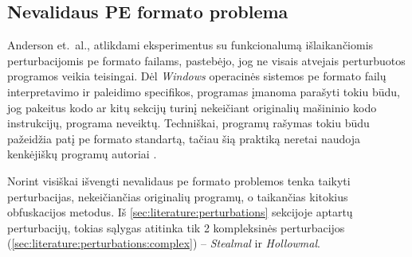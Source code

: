 \subsection{Nevalidaus PE formato problema}\label{sec:literature:pe_invalid}

Anderson et.~al., atlikdami eksperimentus su funkcionalumą išlaikančiomis perturbacijomis \acs{pe} formato failams, pastebėjo, jog ne visais atvejais perturbuotos programos veikia teisingai. Dėl \textit{Windows} operacinės sistemos \acs{pe} formato failų interpretavimo ir paleidimo specifikos, programas įmanoma parašyti tokiu būdu, jog pakeitus kodo ar kitų sekcijų turinį nekeičiant originalių mašininio kodo instrukcijų, programa neveiktų. Techniškai, programų rašymas tokiu būdu pažeidžia patį \acs{pe} formato standartą, tačiau šią praktiką neretai naudoja kenkėjiškų programų autoriai \cite{andersonLearningEvadeStatic2018}.

Norint visiškai išvengti nevalidaus \acs{pe} formato problemos tenka taikyti perturbacijas, nekeičiančias originalių programų, o taikančias kitokius obfuskacijos metodus. Iš \ref{sec:literature:perturbations} sekcijoje aptartų perturbacijų, tokias sąlygas atitinka tik 2 kompleksinės perturbacijos (\ref{sec:literature:perturbations:complex}) -- \textit{Stealmal} ir \textit{Hollowmal}.